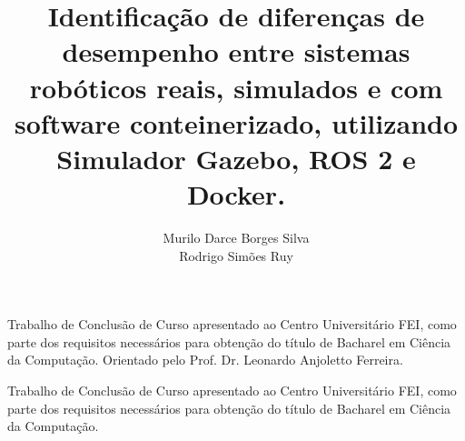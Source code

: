 \documentclass[rascunho,xindy,sublist]{fei}
\author{Murilo Darce Borges Silva\\ Rodrigo Simões Ruy}
\title{Identificação de diferenças de desempenho entre sistemas robóticos reais, simulados e com software conteinerizado, utilizando Simulador Gazebo, ROS 2 e Docker.}
\begin{document}
\maketitle
\begin{folhaderosto}

Trabalho de Conclusão de Curso apresentado ao Centro Universitário FEI, como parte dos requisitos necessários para obtenção do título de Bacharel em Ciência da Computação. Orientado pelo Prof. Dr. Leonardo Anjoletto Ferreira.

\end{folhaderosto}



\begin{folhadeaprovacao}

Trabalho de Conclusão de Curso apresentado ao Centro Universitário FEI, como parte dos requisitos necessários para obtenção do título de Bacharel em Ciência da Computação.

\end{folhadeaprovacao}










\tableofcontents
\end{document}
